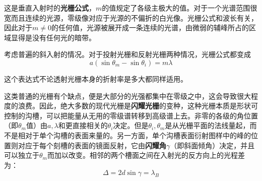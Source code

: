 \documentclass[UTF8]{ctexart}
\begin{document}
\noindent 这是垂直入射时的\textbf{光栅公式}，$ m $的值规定了各级主极大的值。对于一个光谱范围很宽而且连续的光源，零级像对应于光源的不偏折的白光像。光栅公式和波长有关，因此对于$ m \neq 0 $的任何值，光源被展开成一条连续的光谱，由微弱的辅峰所占的区域显得是没有任何光的暗带。

	考虑普遍的斜入射的情况。对于投射光栅和反射光栅两种情况，光栅公式都变成
	\begin{equation}
	a\left(\sin \theta_{m}-\sin \theta_{i}\right)=m \lambda
	\end{equation}
	
\noindent 这个表达式不论透射光栅本身的折射率是多大都同样适用。

	这类普通的光栅有个缺点，便是大部分的光强都集中在零级之中，这会导致很大程度的浪费。因此，绝大多数的现代光栅是\textbf{闪耀光栅}的变种，这种光栅本质是形状可控制的沟槽，可以把能量从无用的零级谱转移到高级谱上去。非零的各级的角位置（即$ \theta_{m} $值）由$ a,\lambda $和更直接相关的$ \theta_{i} $决定。但是$ \theta_{i},\theta_{m} $是从光栅平面的法线量起，而不是相对于单个沟槽的表面来量的。另一方面，单个沟槽表面衍射图样中的峰的位置则对应于每个刻槽的表面的镜面反射，它由\textbf{闪耀角}$ \gamma $（即斜面倾角）决定，并且可以独立于$ \theta_{m} $而加以改变。相邻的两个槽面之间在入射光的反方向上的光程差为：
	\begin{equation}
		\Delta = 2d \sin \gamma=\lambda_{B}
	\end{equation}
	
\end{document}
